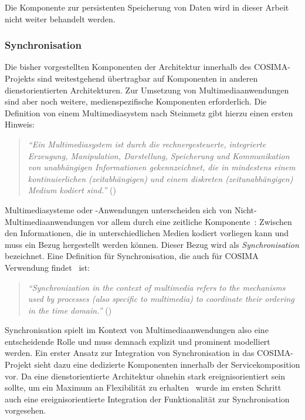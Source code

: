   Die Komponente zur persistenten Speicherung von Daten wird in dieser Arbeit nicht weiter behandelt werden.


\subsubsection{Synchronisation} %
\label{ssub:synchronisation}

  Die bisher vorgestellten Komponenten der Architektur innerhalb des COSIMA-Projekts sind weitestgehend übertragbar auf Komponenten in anderen dienstorientierten Architekturen. Zur Umsetzung von Multimediaanwendungen sind aber noch weitere, medienspezifische Komponenten erforderlich. Die Definition von einem Multimediasystem nach Steinmetz gibt hierzu einen ersten Hinweis:
  
  \begin{quote}
    \emph{"`Ein Multimediasystem ist durch die rechnergesteuerte, integrierte Erzeugung, Manipulation, Darstellung, Speicherung und Kommunikation von unabhängigen Informationen gekennzeichnet, die in mindestens einem kontinuierlichen (zeitabhängigen) und einem diskreten (zeitunabhängigen) Medium kodiert sind."'} (\citep[S. 13]{multimedia_technologie})
  \end{quote}
  
  Multimediasysteme oder -Anwendungen unterscheiden sich von Nicht-Multimediaanwendungen vor allem durch eine zeitliche Komponente~\citep[S. 14]{multimedia_technologie}: Zwischen den Informationen, die in unterschiedlichen Medien kodiert vorliegen kann und muss ein Bezug hergestellt werden können. Dieser Bezug wird als \emph{Synchronisation} bezeichnet. Eine Definition für Synchronisation, die auch für COSIMA Verwendung findet~\citep[S. 27]{bericht} ist:
  
  \begin{quote}
    \emph{"`Synchronization in the context of multimedia refers to the mechanisms used by processes (also specific to multimedia) to coordinate their ordering in the time domain."'} (\citep[S. 401]{steinmetz1990spm})
  \end{quote}
  
  Synchronisation spielt im Kontext von Multimediaanwendungen also eine entscheidende Rolle und muss demnach explizit und prominent modelliert werden. Ein erster Ansatz zur Integration von Synchronisation in das COSIMA-Projekt sieht dazu eine dedizierte Komponenten innerhalb der Servicekomposition vor. Da eine dienstorientierte Architektur ohnehin stark ereignisorientiert sein sollte, um ein Maximum an Flexibilität zu erhalten~\citep[S. 96]{masak2007ssb} wurde im ersten Schritt auch eine ereignisorientierte Integration der Funktionalität zur Synchronisation vorgesehen.
  
